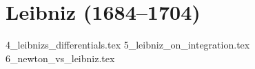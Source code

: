 \section{Leibniz (1684–1704)}  

{4_leibnizs_differentials.tex}
{5_leibniz_on_integration.tex}
{6_newton_vs_leibniz.tex}